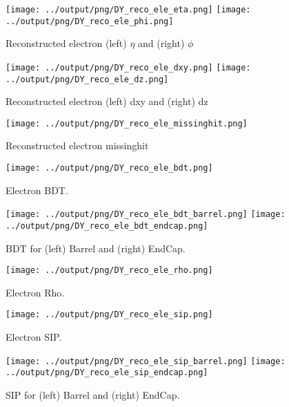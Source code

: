 \documentclass[11pt]{book}
\begin{document}
\begin{figure}[ht]
\centering
\texttt{[image: ../output/png/DY\_reco\_ele\_eta.png]}
\texttt{[image: ../output/png/DY\_reco\_ele\_phi.png]}
\caption{Reconstructed electron (left) $\eta$ and (right) $\phi$}
\label{fig:dy_reco_ele_eta_phi}
\end{figure}

\begin{figure}[ht]
\centering
\texttt{[image: ../output/png/DY\_reco\_ele\_dxy.png]}
\texttt{[image: ../output/png/DY\_reco\_ele\_dz.png]}
\caption{Reconstructed electron (left) dxy and (right) dz}
\label{fig:dy_reco_ele_dxy_dz}
\end{figure}

\begin{figure}[ht]
\centering
\texttt{[image: ../output/png/DY\_reco\_ele\_missinghit.png]}
\caption{Reconstructed electron missinghit}
\label{fig:dy_reco_ele_missinghit}
\end{figure}

\begin{figure}[ht]
\centering
\texttt{[image: ../output/png/DY\_reco\_ele\_bdt.png]}
\caption{Electron BDT.}
\label{fig:dy_reco_ele_bdt}
\end{figure}

\begin{figure}[ht]
\centering
\texttt{[image: ../output/png/DY\_reco\_ele\_bdt\_barrel.png]}
\texttt{[image: ../output/png/DY\_reco\_ele\_bdt\_endcap.png]}
\caption{BDT for (left) Barrel and (right) EndCap.}
\label{fig:dy_reco_ele_bdt_regions}
\end{figure}

\begin{figure}[ht]
\centering
\texttt{[image: ../output/png/DY\_reco\_ele\_rho.png]}
\caption{Electron Rho.}
\label{fig:dy_reco_ele_rho}
\end{figure}

\begin{figure}[ht]
\centering
\texttt{[image: ../output/png/DY\_reco\_ele\_sip.png]}
\caption{Electron SIP.}
\label{fig:dy_reco_ele_sip}
\end{figure}

\begin{figure}[ht]
\centering
\texttt{[image: ../output/png/DY\_reco\_ele\_sip\_barrel.png]}
\texttt{[image: ../output/png/DY\_reco\_ele\_sip\_endcap.png]}
\caption{SIP for (left) Barrel and (right) EndCap.}
\label{fig:dy_reco_ele_sip_regions}
\end{figure}
\clearpage
\end{document}
